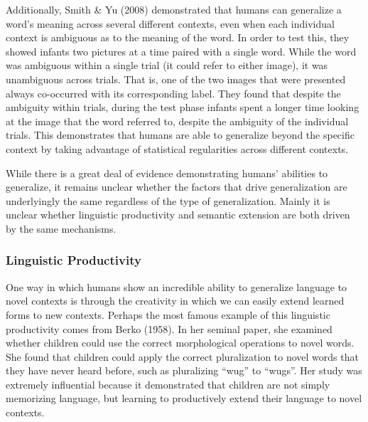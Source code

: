 \documentclass[
  letterpaper,
  DIV=11,
  numbers=noendperiod]{scrartcl}
\begin{document}
Additionally, Smith \& Yu (2008) demonstrated that humans can generalize
a word's meaning across several different contexts, even when each
individual context is ambiguous as to the meaning of the word. In order
to test this, they showed infants two pictures at a time paired with a
single word. While the word was ambiguous within a single trial (it
could refer to either image), it was unambiguous across trials. That is,
one of the two images that were presented always co-occurred with its
corresponding label. They found that despite the ambiguity within
trials, during the test phase infants spent a longer time looking at the
image that the word referred to, despite the ambiguity of the individual
trials. This demonstrates that humans are able to generalize beyond the
specific context by taking advantage of statistical regularities across
different contexts.

While there is a great deal of evidence demonstrating humans' abilities
to generalize, it remains unclear whether the factors that drive
generalization are underlyingly the same regardless of the type of
generalization. Mainly it is unclear whether linguistic productivity and
semantic extension are both driven by the same mechanisms.

\subsubsection{Linguistic Productivity}\label{linguistic-productivity}

One way in which humans show an incredible ability to generalize
language to novel contexts is through the creativity in which we can
easily extend learned forms to new contexts. Perhaps the most famous
example of this linguistic productivity comes from Berko (1958). In her
seminal paper, she examined whether children could use the correct
morphological operations to novel words. She found that children could
apply the correct pluralization to novel words that they have never
heard before, such as pluralizing ``wug'' to ``wugs''. Her study was
extremely influential because it demonstrated that children are not
simply memorizing language, but learning to productively extend their
language to novel contexts.
\end{document}
